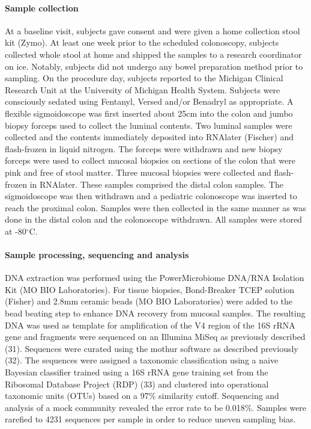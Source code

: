 \documentclass[12pt,]{article}
\let\oldparagraph\paragraph
\renewcommand{\paragraph}[1]{\oldparagraph{#1}\mbox{}}
\begin{document}
\paragraph{Sample collection}\label{sample-collection}

At a baseline visit, subjects gave consent and were given a home
collection stool kit (Zymo). At least one week prior to the scheduled
colonoscopy, subjects collected whole stool at home and shipped the
samples to a research coordinator on ice. Notably, subjects did not
undergo any bowel preparation method prior to sampling. On the procedure
day, subjects reported to the Michigan Clinical Research Unit at the
University of Michigan Health System. Subjects were consciously sedated
using Fentanyl, Versed and/or Benadryl as appropriate. A flexible
sigmoidoscope was first inserted about 25cm into the colon and jumbo
biopsy forceps used to collect the luminal contents. Two luminal samples
were collected and the contents immediately deposited into RNAlater
(Fischer) and flash-frozen in liquid nitrogen. The forceps were
withdrawn and new biopsy forceps were used to collect mucosal biopsies
on sections of the colon that were pink and free of stool matter. Three
mucosal biopsies were collected and flash-frozen in RNAlater. These
samples comprised the distal colon samples. The sigmoidoscope was then
withdrawn and a pediatric colonoscope was inserted to reach the proximal
colon. Samples were then collected in the same manner as was done in the
distal colon and the colonoscope withdrawn. All samples were stored at
-80\(^\circ\)C.

\paragraph{Sample processing, sequencing and
analysis}\label{sample-processing-sequencing-and-analysis}

DNA extraction was performed using the PowerMicrobiome DNA/RNA Isolation
Kit (MO BIO Laboratories). For tissue biopsies, Bond-Breaker TCEP
solution (Fisher) and 2.8mm ceramic beads (MO BIO Laboratories) were
added to the bead beating step to enhance DNA recovery from mucosal
samples. The resulting DNA was used as template for amplification of the
V4 region of the 16S rRNA gene and fragments were sequenced on an
Illumina MiSeq as previously described (31). Sequences were curated
using the mothur software as described previously (32). The sequences
were assigned a taxonomic classification using a naive Bayesian
classifier trained using a 16S rRNA gene training set from the Ribosomal
Database Project (RDP) (33) and clustered into operational taxonomic
units (OTUs) based on a 97\% similarity cutoff. Sequencing and analysis
of a mock community revealed the error rate to be 0.018\%. Samples were
rarefied to 4231 sequences per sample in order to reduce uneven sampling
bias.
\end{document}
